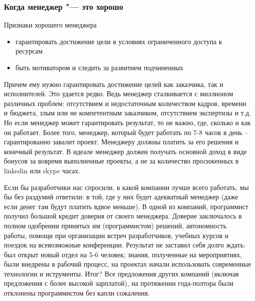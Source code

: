 \documentclass{../industrial-development}
\begin{document}
\begin{frame} \frametitle{Когда менеджер "--- это хорошо}
	\begin{block}{Признаки хорошего менеджера}
		\begin{itemize}
			\item гарантировать достижение цели в условиях ограниченного доступа к ресурсам
			\item быть мотиватором и следить за развитием подчиненных
		\end{itemize}
	\end{block}
\end{frame}
\lecturenotes
Причем ему нужно гарантировать достижение целей как заказчика, так и исполнителей. Это удается редко. Ведь менеджер сталкивается с миллионом различных проблем: отсутствием и недостаточным количеством кадров, времени и бюджета, злым или не компетентным заказчиком, отсутствием экспертизы и т.д. 
Но если менеджер может гарантировать результат, то не важно, где, сколько и как он работает. Более того, менеджер, который будет работать по 7-8 часов в день – гарантированно завалит проект. Менеджеру должны платить за его решения и конечный результат. В идеале менеджер должен получать основной доход в виде бонусов за вовремя выполненные проекты, а не за количество просиженных в linkedin или skype часах. 

Если бы разработчики нас спросили, в какой компании лучше всего работать, мы бы без раздумий ответили: в той, где у них будет адекватный менеджер (даже если денег там будут платить вдвое меньше). 
В одной из компаний, программист получил большой кредит доверия от своего менеджера. Доверие заключалось в полном одобрении принятых им (программистом) решений, автономность работы, помощи при организации встреч разработчиков, учебных курсов и поездок на всевозможные конференции. Результат не заставил себя долго ждать: был открыт новый отдел на 5-6 человек; знания, полученные на мероприятиях, были внедрены в рабочий процесс, на проектах начали использовать современные технологии и иструменты. Итог? Все предложения других компаний (включая предложения с более высокой зарплатой), на протяжении года-полтора были отклонены программистом без капли сожаления.
~\cite{Managers_in_IT}
\end{document}
